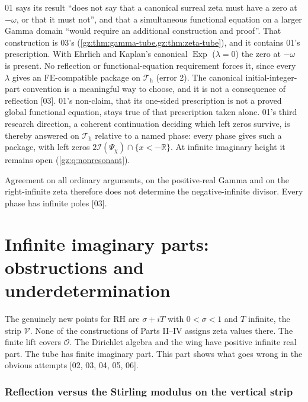 \documentclass[11pt,a4paper]{article}
\numberwithin{equation}{section}
\theoremstyle{definition}
\theoremstyle{remark}
\newcommand{\R}{\mathbb R}
\newcommand{\OO}{\mathcal O}
\newcommand{\Exp}{\operatorname{Exp}}
\newcommand{\cI}{\mathcal I}
\newcommand{\Th}{\mathcal T_{\mathrm h}}
\newcommand{\Vs}{\mathcal V}
\newcommand{\src}[1]{\textup{[#1]}}
\begin{document}
\begin{remark}\label{gz:rem:stale01}
01 says its result ``does not say that a canonical surreal zeta must have a
zero at $-\omega$, or that it must not'', and that a simultaneous functional
equation on a larger Gamma domain ``would require an additional
construction and proof''. That construction is 03's
(\cref{gz:thm:gamma-tube,gz:thm:zeta-tube}), and it contains 01's
prescription. With Ehrlich and Kaplan's canonical $\Exp$ ($\lambda=0$) the
zero at $-\omega$ is present. No reflection or functional-equation
requirement forces it, since every $\lambda$ gives an FE-compatible package
on $\Th$ (error 2). The canonical initial-integer-part convention is a
meaningful way to choose, and it is not a consequence of reflection
\src{03}. 01's non-claim, that its one-sided prescription is not a proved
global functional equation, stays true of that prescription taken alone.
01's third research direction, a coherent continuation deciding which left
zeros survive, is thereby answered on $\Th$ relative to a named phase:
every phase gives such a package, with left zeros
$2\cI(\Psi_\chi)\cap\{x<-\R\}$. At infinite imaginary height it remains
open (\cref{gz:q:nonresonant}).
\end{remark}
Agreement on all ordinary arguments, on the positive-real Gamma and on the
right-infinite zeta therefore does not determine the negative-infinite
divisor. Every phase has infinite poles \src{03}.

\part{Infinite imaginary parts: obstructions and underdetermination}\label{gz:part:infinite}

The genuinely new points for RH are $\sigma+iT$ with $0<\sigma<1$ and $T$
infinite, the strip $\Vs$. None of the constructions of Parts II--IV assigns
zeta values there. The finite lift covers $\OO$. The Dirichlet algebra and
the wing have positive infinite real part. The tube has finite imaginary
part. This part shows what goes wrong in the obvious attempts \src{02, 03,
04, 05, 06}.

\section{Reflection versus the Stirling modulus on the vertical strip}\label{gz:sec:strip}
\end{document}

